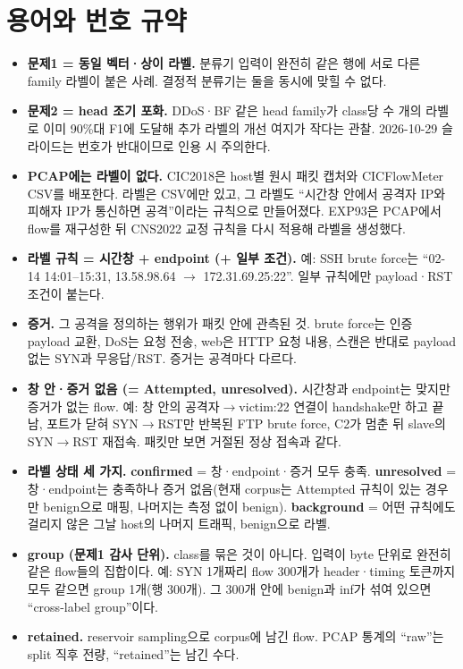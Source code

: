 \section{용어와 번호 규약}
\begin{itemize}
\item \textbf{문제1 = 동일 벡터·상이 라벨.} 분류기 입력이 완전히 같은 행에 서로 다른 family 라벨이 붙은 사례. 결정적 분류기는 둘을 동시에 맞힐 수 없다.
\item \textbf{문제2 = head 조기 포화.} DDoS·BF 같은 head family가 class당 수 개의 라벨로 이미 90\%대 F1에 도달해 추가 라벨의 개선 여지가 작다는 관찰. 2026-10-29 슬라이드는 번호가 반대이므로 인용 시 주의한다.
\item \textbf{PCAP에는 라벨이 없다.} CIC2018은 host별 원시 패킷 캡처와 CICFlowMeter CSV를 배포한다. 라벨은 CSV에만 있고, 그 라벨도 ``시간창 안에서 공격자 IP와 피해자 IP가 통신하면 공격''이라는 규칙으로 만들어졌다. EXP93은 PCAP에서 flow를 재구성한 뒤 CNS2022 교정 규칙을 다시 적용해 라벨을 생성했다.
\item \textbf{라벨 규칙 = 시간창 + endpoint (+ 일부 조건).} 예: SSH brute force는 ``02-14 14:01--15:31, 13.58.98.64 $\to$ 172.31.69.25:22''. 일부 규칙에만 payload·RST 조건이 붙는다.
\item \textbf{증거.} 그 공격을 정의하는 행위가 패킷 안에 관측된 것. brute force는 인증 payload 교환, DoS는 요청 전송, web은 HTTP 요청 내용, 스캔은 반대로 payload 없는 SYN과 무응답/RST. 증거는 공격마다 다르다.
\item \textbf{창 안·증거 없음 (= Attempted, unresolved).} 시간창과 endpoint는 맞지만 증거가 없는 flow. 예: 창 안의 공격자$\to$victim:22 연결이 handshake만 하고 끝남, 포트가 닫혀 SYN$\to$RST만 반복된 FTP brute force, C2가 멈춘 뒤 slave의 SYN$\to$RST 재접속. 패킷만 보면 거절된 정상 접속과 같다.
\item \textbf{라벨 상태 세 가지.} \textbf{confirmed} = 창·endpoint·증거 모두 충족. \textbf{unresolved} = 창·endpoint는 충족하나 증거 없음(현재 corpus는 Attempted 규칙이 있는 경우만 benign으로 매핑, 나머지는 측정 없이 benign). \textbf{background} = 어떤 규칙에도 걸리지 않은 그날 host의 나머지 트래픽, benign으로 라벨.
\item \textbf{group (문제1 감사 단위).} class를 묶은 것이 아니다. 입력이 byte 단위로 완전히 같은 flow들의 집합이다. 예: SYN 1개짜리 flow 300개가 header·timing 토큰까지 모두 같으면 group 1개(행 300개). 그 300개 안에 benign과 inf가 섞여 있으면 ``cross-label group''이다.
\item \textbf{retained.} reservoir sampling으로 corpus에 남긴 flow. PCAP 통계의 ``raw''는 split 직후 전량, ``retained''는 남긴 수다.
\end{itemize}

